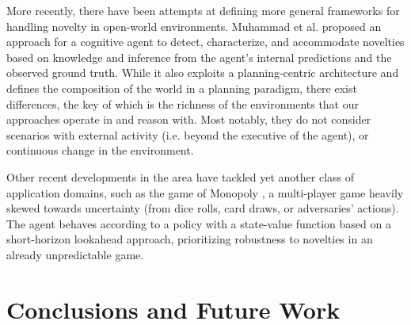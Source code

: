 \documentclass[sigconf]{aamas}
\begin{document}
More recently, there have been attempts at defining more general frameworks for handling novelty in open-world environments. 
Muhammad et al. \cite{muhammad2021novelty} proposed an approach for a cognitive agent to detect, characterize, and accommodate novelties based on knowledge and inference from the agent's internal predictions and the observed ground truth. 
While it also exploits a planning-centric architecture and defines the composition of the world in a planning paradigm, there exist differences, the key of which is the richness of the environments that our approaches operate in and reason with. Most notably, they do not consider scenarios with external activity (i.e. beyond the executive of the agent), or continuous change in the environment. 

Other recent developments in the area have tackled yet another class of application domains, such as the game of Monopoly \cite{gopalakrishnan2021integrating}, a multi-player game heavily skewed towards uncertainty (from dice rolls, card draws, or adversaries' actions). The agent behaves according to a policy with a state-value function based on a short-horizon lookahead approach, prioritizing robustness to novelties in an already unpredictable game. 






\section{Conclusions and Future Work}
\todo[inline,color=green]
\end{document}
